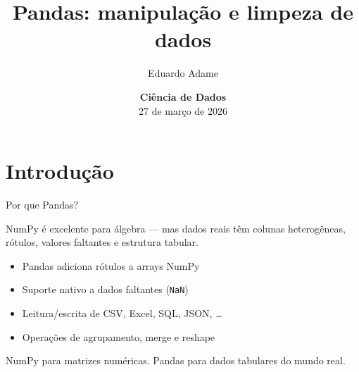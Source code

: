\documentclass[xcolor=dvipsnames,t,aspectratio=169]{beamer}
\title{Pandas: manipulação e limpeza de dados}
\author{Eduardo Adame}
\date{{\color{nes_dark_purple}\textbf{Ciência de Dados}\\[0.5em] 27 de março de 2026 }}
\newcommand{\highlight}[1]{{\color{nes_dark_orange} #1}}
\begin{document}
\frame[plain]{\titlepage}
\setcounter{framenumber}{0}


\section{Introdução}

\begin{frame}[c]{Por que Pandas?}

NumPy é excelente para álgebra — mas dados reais têm \highlight{colunas heterogêneas}, \highlight{rótulos}, \highlight{valores faltantes} e \highlight{estrutura tabular}.


\begin{itemize}
    \item Pandas adiciona \highlight{rótulos} a arrays NumPy
    \item Suporte nativo a dados faltantes (\texttt{NaN})
    \item Leitura/escrita de CSV, Excel, SQL, JSON, \ldots
    \item Operações de agrupamento, merge e reshape
\end{itemize}

\begin{display}
NumPy para matrizes numéricas. Pandas para dados tabulares do mundo real.
\end{display}

\end{frame}
\end{document}
